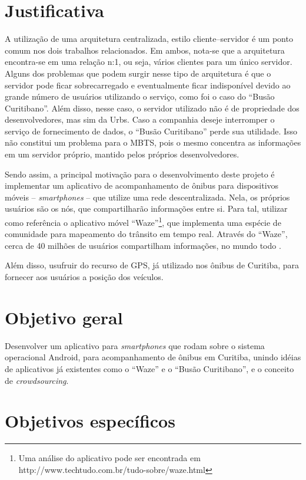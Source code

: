 \section{Justificativa}

A utilização de uma arquitetura centralizada, estilo cliente--servidor é um ponto comum nos dois trabalhos relacionados. Em ambos, nota-se que a arquitetura encontra-se em uma relação n:1, ou seja, vários clientes para um único servidor. Alguns dos problemas que podem surgir nesse tipo de arquitetura é que o servidor pode ficar sobrecarregado e eventualmente ficar indisponível devido ao grande número de usuários utilizando o serviço, como foi o caso do ``Busão Curitibano''. Além disso, nesse caso, o servidor utilizado não é de propriedade dos desenvolvedores, mas sim da Urbs. Caso a companhia deseje interromper o serviço de fornecimento de dados, o ``Busão Curitibano'' perde sua utilidade. Isso não constitui um problema para o MBTS, pois o mesmo concentra as informações em um servidor próprio, mantido pelos próprios desenvolvedores.

Sendo assim, a principal motivação para o desenvolvimento deste projeto é implementar um aplicativo de acompanhamento de ônibus para dispositivos móveis -- \textit{smartphones} -- que utilize uma rede descentralizada. Nela, os próprios usuários são os nós, que compartilharão informações entre si. Para tal, utilizar como referência o aplicativo móvel ``Waze''\footnote{Uma análise do aplicativo pode ser encontrada em http://www.techtudo.com.br/tudo-sobre/waze.html}, que implementa uma espécie de comunidade para mapeamento do trânsito em tempo real. Através do ``Waze'', cerca de 40 milhões de usuários compartilham informações, no mundo todo \cite{techtudoWaze}.

Além disso, usufruir do recurso de GPS, já utilizado nos ônibus de Curitiba, para fornecer aos usuários a posição dos veículos.

\section{Objetivo geral}

Desenvolver um aplicativo para \textit{smartphones} que rodam sobre o sistema operacional Android, para acompanhamento de ônibus em Curitiba, unindo idéias de aplicativos já existentes como o ``Waze'' e o ``Busão Curitibano'', e o conceito de \emph{crowdsourcing}.

\section{Objetivos específicos}

